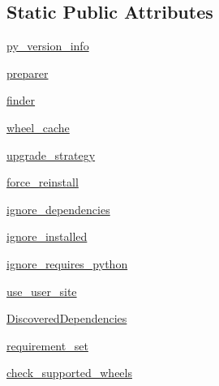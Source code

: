 \subsection*{Static Public Attributes}
\begin{DoxyCompactItemize}
\item 
\hyperlink{classpip_1_1__internal_1_1resolution_1_1legacy_1_1resolver_1_1Resolver_ad57bb2988914d9689933d777f4fa9448}{py\+\_\+version\+\_\+info}
\item 
\hyperlink{classpip_1_1__internal_1_1resolution_1_1legacy_1_1resolver_1_1Resolver_ab9e428e94b98325ff87dbc88c77333da}{preparer}
\item 
\hyperlink{classpip_1_1__internal_1_1resolution_1_1legacy_1_1resolver_1_1Resolver_a874a06f503d2d066a9eeb6778b92d21e}{finder}
\item 
\hyperlink{classpip_1_1__internal_1_1resolution_1_1legacy_1_1resolver_1_1Resolver_a7e916dc9dce33d8d531e5c422305b70f}{wheel\+\_\+cache}
\item 
\hyperlink{classpip_1_1__internal_1_1resolution_1_1legacy_1_1resolver_1_1Resolver_ab5ac21be319236cede065776bb72e227}{upgrade\+\_\+strategy}
\item 
\hyperlink{classpip_1_1__internal_1_1resolution_1_1legacy_1_1resolver_1_1Resolver_a5328cc63d530dd2632f52a8c67444a7f}{force\+\_\+reinstall}
\item 
\hyperlink{classpip_1_1__internal_1_1resolution_1_1legacy_1_1resolver_1_1Resolver_a8d8c640164e8ea20891bad88e714931c}{ignore\+\_\+dependencies}
\item 
\hyperlink{classpip_1_1__internal_1_1resolution_1_1legacy_1_1resolver_1_1Resolver_a21d85fdaa8e09adabf6763bc49446b52}{ignore\+\_\+installed}
\item 
\hyperlink{classpip_1_1__internal_1_1resolution_1_1legacy_1_1resolver_1_1Resolver_a4b1593246fdfa2e23fd718916c8712b7}{ignore\+\_\+requires\+\_\+python}
\item 
\hyperlink{classpip_1_1__internal_1_1resolution_1_1legacy_1_1resolver_1_1Resolver_a88c7b02d76a4f397c46fa3baf33e8a2f}{use\+\_\+user\+\_\+site}
\item 
\hyperlink{classpip_1_1__internal_1_1resolution_1_1legacy_1_1resolver_1_1Resolver_a25585c390722daa86a7e4f620b46fce2}{Discovered\+Dependencies}
\item 
\hyperlink{classpip_1_1__internal_1_1resolution_1_1legacy_1_1resolver_1_1Resolver_a9dbb24cb2bea9a42382beb26d05c044a}{requirement\+\_\+set}
\item 
\hyperlink{classpip_1_1__internal_1_1resolution_1_1legacy_1_1resolver_1_1Resolver_a0bfbbf47ad044b006cde95f92bd9fa27}{check\+\_\+supported\+\_\+wheels}

\end{DoxyCompactItemize}
